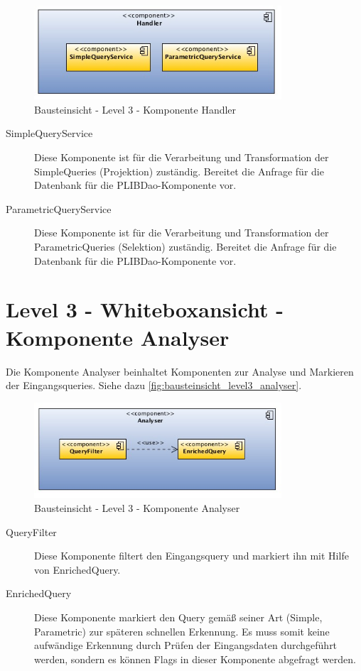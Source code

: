 \begin{figure}[htbp]
	\centering
		\includegraphics[width=0.82\textwidth]{images/bausteinsicht_plib_level3_handler.jpg}
	\caption{Bausteinsicht - Level 3 - Komponente Handler}
	\label{fig:bausteinsicht_level3_handler}
\end{figure}

\begin{description}
\item[SimpleQueryService] Diese Komponente ist für die Verarbeitung und Transformation der SimpleQueries (Projektion) zuständig. Bereitet die Anfrage für die Datenbank für die PLIBDao-Komponente vor. 
\item[ParametricQueryService] Diese Komponente ist für die Verarbeitung und Transformation der ParametricQueries (Selektion) zuständig. Bereitet die Anfrage für die Datenbank für die PLIBDao-Komponente vor. 
\end{description}

\section{Level 3 - Whiteboxansicht - Komponente Analyser}

Die Komponente Analyser beinhaltet Komponenten zur Analyse und Markieren der Eingangsqueries. Siehe dazu \autoref{fig:bausteinsicht_level3_analyser}. 

\begin{figure}[htbp]
	\centering
		\includegraphics[width=0.82\textwidth]{images/bausteinsicht_plib_level3_analyser.jpg}
	\caption{Bausteinsicht - Level 3 - Komponente Analyser}
	\label{fig:bausteinsicht_level3_analyser}
\end{figure}

\begin{description}
\item[QueryFilter] Diese Komponente filtert den Eingangsquery und markiert ihn mit Hilfe von EnrichedQuery.
\item[EnrichedQuery] Diese Komponente markiert den Query gemäß seiner Art (Simple, Parametric) zur späteren schnellen Erkennung. Es muss somit keine aufwändige Erkennung durch Prüfen der Eingangsdaten durchgeführt werden, sondern es können Flags in dieser Komponente abgefragt werden. 
\end{description}
